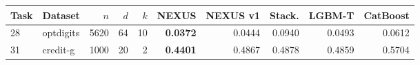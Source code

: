 \begin{longtable}{llrrrrrrrr}
\toprule
Task & Dataset & $n$ & $d$ & $k$ & NEXUS & NEXUS v1 & Stack. & LGBM-T & CatBoost\\
\midrule
\endhead
28 & optdigits & 5620 & 64 & 10 & \textbf{0.0372} & 0.0444 & 0.0940 & 0.0493 & 0.0612\\
31 & credit-g & 1000 & 20 & 2 & \textbf{0.4401} & 0.4867 & 0.4878 & 0.4859 & 0.5704\\
\bottomrule
\end{longtable}

